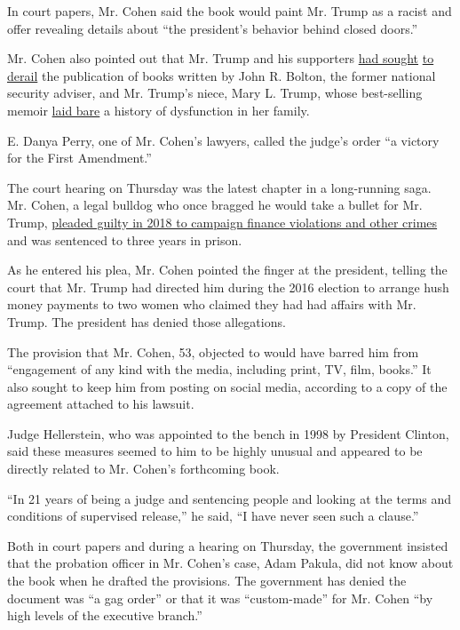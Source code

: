 In court papers, Mr. Cohen said the book would paint Mr. Trump as a
racist and offer revealing details about ``the president's behavior
behind closed doors.''

Mr. Cohen also pointed out that Mr. Trump and his supporters
\href{https://www.nytimes.com/2020/06/20/us/politics/john-bolton-book-ruling.html}{had
sought}
\href{https://www.nytimes.com/2020/07/13/us/politics/mary-trump-book.html}{to
derail} the publication of books written by John R. Bolton, the former
national security adviser, and Mr. Trump's niece, Mary L. Trump, whose
best-selling memoir
\href{https://www.nytimes.com/2020/07/08/books/review/mary-trump-book-takeaways.html}{laid
bare} a history of dysfunction in her family.

E. Danya Perry, one of Mr. Cohen's lawyers, called the judge's order ``a
victory for the First Amendment.''

The court hearing on Thursday was the latest chapter in a long-running
saga. Mr. Cohen, a legal bulldog who once bragged he would take a bullet
for Mr. Trump,
\href{https://slack-redir.net/link?url=https\%3A\%2F\%2Fwww.nytimes.com\%2F2018\%2F08\%2F21\%2Fnyregion\%2Fmichael-cohen-guilty-plea-trump-takeaways.html}{pleaded
guilty in 2018 to campaign finance violations and other crimes} and was
sentenced to three years in prison.

As he entered his plea, Mr. Cohen pointed the finger at the president,
telling the court that Mr. Trump had directed him during the 2016
election to arrange hush money payments to two women who claimed they
had had affairs with Mr. Trump. The president has denied those
allegations.

The provision that Mr. Cohen, 53, objected to would have barred him from
``engagement of any kind with the media, including print, TV, film,
books.'' It also sought to keep him from posting on social media,
according to a copy of the agreement attached to his lawsuit.

Judge Hellerstein, who was appointed to the bench in 1998 by President
Clinton, said these measures seemed to him to be highly unusual and
appeared to be directly related to Mr. Cohen's forthcoming book.

``In 21 years of being a judge and sentencing people and looking at the
terms and conditions of supervised release,'' he said, ``I have never
seen such a clause.''

Both in court papers and during a hearing on Thursday, the government
insisted that the probation officer in Mr. Cohen's case, Adam Pakula,
did not know about the book when he drafted the provisions. The
government has denied the document was ``a gag order'' or that it was
``custom-made'' for Mr. Cohen ``by high levels of the executive
branch.''

